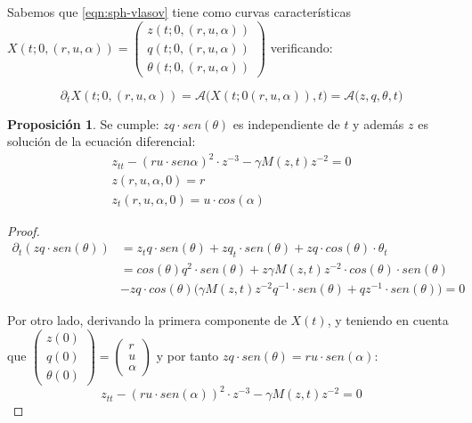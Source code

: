 \documentclass[a4paper,10pt]{scrartcl}
\theoremstyle{definition}
\newtheorem{fact}{Proposición}
\numberwithin{equation}{section}
\begin{document}
Sabemos que \eqref{eqn:sph-vlasov} tiene como curvas características $X(t; 0, (r,u,\alpha)) = 
\left(\begin{array}{c} 
       z(t; 0, (r, u, \alpha))\\ q(t; 0, (r, u, \alpha))\\ \theta(t; 0, (r, u, \alpha))
      \end{array}\right)$
verificando:

\begin{equation}
\label{eqn:sph-cc}
\partial_t X(t; 0,(r,u,\alpha)) = \mathcal{A}\big(X(t;0(r,u,\alpha)),t\big) = \mathcal{A}\big(z,q,\theta,t\big)
\end{equation}

\begin{fact} Se cumple:
 $zq \cdot sen(\theta)$ es independiente de $t$ y además $z$ es solución de la ecuación diferencial:
 \begin{align}
 z_{tt} - (ru \cdot sen\alpha)^2 \cdot z^{-3} - \gamma M(z,t) z^{-2} = 0\nonumber\\
 z(r,u,\alpha, 0) = r \nonumber\\
 z_t(r,u,\alpha,0) = u\cdot cos(\alpha)
 \label{eqn:curves}
 \end{align}
\end{fact}
\begin{proof}
 \begin{align*}
  \partial_t(zq \cdot sen(\theta)) &= z_t q\cdot sen(\theta) + zq_t \cdot sen(\theta) + zq \cdot cos(\theta) \cdot \theta_t \\
  &= cos(\theta) q^2 \cdot sen(\theta) + z\gamma M(z,t) z^{-2} \cdot cos(\theta) \cdot sen(\theta) \\
  &- zq \cdot cos(\theta) \Bigg(\gamma M(z,t) z^{-2} q^{-1} \cdot sen(\theta)  + qz^{-1}\cdot sen(\theta) \Bigg) = 0
 \end{align*}

Por otro lado, derivando la primera componente de $X(t)$, y teniendo en cuenta que $\left(\begin{array}{c} z(0)\\ q(0)\\ \theta(0) \end{array}\right) = 
\left(\begin{array}{c} r\\ u\\ \alpha\end{array}\right)$ y por tanto $zq\cdot sen(\theta) = ru\cdot sen(\alpha)$:
\begin{equation}
 z_{tt} - (ru \cdot sen(\alpha))^2 \cdot z^{-3} - \gamma M(z,t) z^{-2} = 0
\end{equation}
\end{proof}
\end{document}
